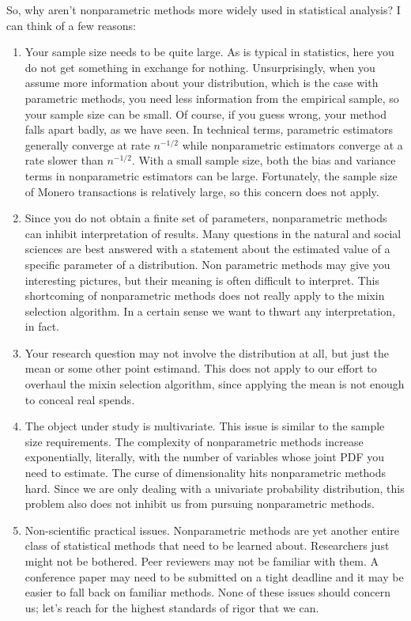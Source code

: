 \documentclass[english]{paper}
\begin{document}
So, why aren't nonparametric methods more widely used in statistical
analysis? I can think of a few reasons:
\begin{enumerate}
\item Your sample size needs to be quite large. As is typical in statistics,
here you do not get something in exchange for nothing. Unsurprisingly,
when you assume more information about your distribution, which is
the case with parametric methods, you need less information from the
empirical sample, so your sample size can be small. Of course, if
you guess wrong, your method falls apart badly, as we have seen. In
technical terms, parametric estimators generally converge at rate
$n^{-1/2}$ while nonparametric estimators converge at a rate slower
than $n^{-1/2}$. With a small sample size, both the bias and variance
terms in nonparametric estimators can be large. Fortunately, the sample
size of Monero transactions is relatively large, so this concern does
not apply.
\item Since you do not obtain a finite set of parameters, nonparametric
methods can inhibit interpretation of results. Many questions in the
natural and social sciences are best answered with a statement about
the estimated value of a specific parameter of a distribution. Non
parametric methods may give you interesting pictures, but their meaning
is often difficult to interpret. This shortcoming of nonparametric
methods does not really apply to the mixin selection algorithm. In
a certain sense we want to thwart any interpretation, in fact.
\item Your research question may not involve the distribution at all, but
just the mean or some other point estimand. This does not apply to
our effort to overhaul the mixin selection algorithm, since applying
the mean is not enough to conceal real spends.
\item The object under study is multivariate. This issue is similar to the
sample size requirements. The complexity of nonparametric methods
increase exponentially, literally, with the number of variables whose
joint PDF you need to estimate. The curse of dimensionality hits nonparametric
methods hard. Since we are only dealing with a univariate probability
distribution, this problem also does not inhibit us from pursuing
nonparametric methods.
\item Non-scientific practical issues. Nonparametric methods are yet another
entire class of statistical methods that need to be learned about.
Researchers just might not be bothered. Peer reviewers may not be
familiar with them. A conference paper may need to be submitted on
a tight deadline and it may be easier to fall back on familiar methods.
None of these issues should concern us; let's reach for the highest
standards of rigor that we can.
\end{enumerate}
\end{document}
